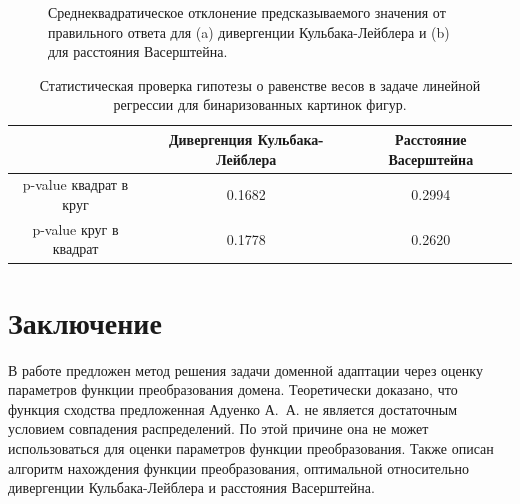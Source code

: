 \documentclass[12pt]{extarticle}
\begin{document}
\begin{figure}[H]
    \centering
    \qquad
    
    \caption{Среднеквадратическое отклонение предсказываемого значения от правильного ответа для (a) дивергенции Кульбака-Лейблера и (b) для расстояния Васерштейна.}
\end{figure}

\begin{table}[H]
    \centering
    \begin{tabular}{||c|c|c||}
        \hline 
         & Дивергенция Кульбака-Лейблера & Расстояние Васерштейна \\
        \hline\hline
        p-value квадрат в круг & 0.1682 & 0.2994 \\
        \hline
        p-value круг в квадрат & 0.1778 & 0.2620 \\
        \hline
    \end{tabular}
    \caption{Статистическая проверка гипотезы о равенстве весов в задаче линейной регрессии для бинаризованных картинок фигур.}
    \label{tab:my_label}
\end{table}

\newpage
\section{Заключение}

В работе предложен метод решения задачи доменной адаптации через оценку параметров функции преобразования домена. Теоретически доказано, что функция сходства предложенная Адуенко А.\ А. не является достаточным условием совпадения распределений. По этой причине она не может использоваться для оценки параметров функции преобразования. Также описан алгоритм нахождения функции преобразования, оптимальной относительно дивергенции Кульбака-Лейблера и расстояния Васерштейна.
\end{document}
